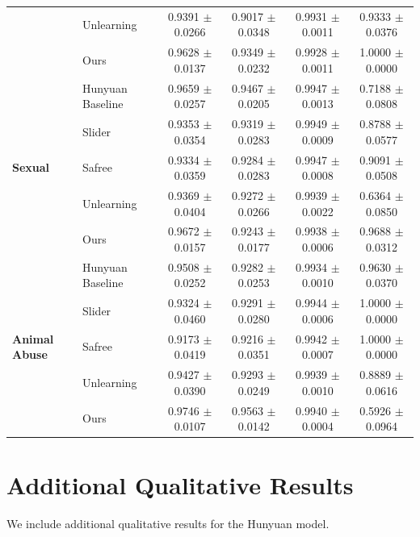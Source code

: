 \documentclass{article}
\begin{document}
\begin{table}[ht]
{\begin{tabular}{ll cccc}
 & Unlearning \cite{facchiano2025video}  & 0.9391 $\pm$ 0.0266 & 0.9017 $\pm$ 0.0348 & 0.9931 $\pm$ 0.0011 & 0.9333 $\pm$ 0.0376 \\
 & Ours         & 0.9628 $\pm$ 0.0137 & 0.9349 $\pm$ 0.0232 & 0.9928 $\pm$ 0.0011 & 1.0000 $\pm$ 0.0000 \\
\midrule
\multirow{5}{*}{\textbf{Sexual}} 
 & Hunyuan Baseline & 0.9659 $\pm$ 0.0257 & 0.9467 $\pm$ 0.0205 & 0.9947 $\pm$ 0.0013 & 0.7188 $\pm$ 0.0808 \\
 & Slider   \cite{ekin2026unreasonable}    & 0.9353 $\pm$ 0.0354 & 0.9319 $\pm$ 0.0283 & 0.9949 $\pm$ 0.0009 & 0.8788 $\pm$ 0.0577 \\
 & Safree   \cite{yoon2024safree}     & 0.9334 $\pm$ 0.0359 & 0.9284 $\pm$ 0.0283 & 0.9947 $\pm$ 0.0008 & 0.9091 $\pm$ 0.0508 \\
 & Unlearning \cite{facchiano2025video}  & 0.9369 $\pm$ 0.0404 & 0.9272 $\pm$ 0.0266 & 0.9939 $\pm$ 0.0022 & 0.6364 $\pm$ 0.0850 \\
 & Ours         & 0.9672 $\pm$ 0.0157 & 0.9243 $\pm$ 0.0177 & 0.9938 $\pm$ 0.0006 & 0.9688 $\pm$ 0.0312 \\
\midrule
\multirow{5}{*}{\textbf{Animal Abuse}} 
 & Hunyuan Baseline & 0.9508 $\pm$ 0.0252 & 0.9282 $\pm$ 0.0253 & 0.9934 $\pm$ 0.0010 & 0.9630 $\pm$ 0.0370 \\
 & Slider \cite{ekin2026unreasonable}      & 0.9324 $\pm$ 0.0460 & 0.9291 $\pm$ 0.0280 & 0.9944 $\pm$ 0.0006 & 1.0000 $\pm$ 0.0000 \\
 & Safree    \cite{yoon2024safree}    & 0.9173 $\pm$ 0.0419 & 0.9216 $\pm$ 0.0351 & 0.9942 $\pm$ 0.0007 & 1.0000 $\pm$ 0.0000 \\
 & Unlearning \cite{facchiano2025video}  & 0.9427 $\pm$ 0.0390 & 0.9293 $\pm$ 0.0249 & 0.9939 $\pm$ 0.0010 & 0.8889 $\pm$ 0.0616 \\
 & Ours         & 0.9746 $\pm$ 0.0107 & 0.9563 $\pm$ 0.0142 & 0.9940 $\pm$ 0.0004 & 0.5926 $\pm$ 0.0964 \\
\bottomrule
\end{tabular}%
}
\end{table}

\FloatBarrier
\clearpage
\section{Additional Qualitative Results}\label{app:qualitative_results}

We include additional qualitative results for the Hunyuan model.
\end{document}
